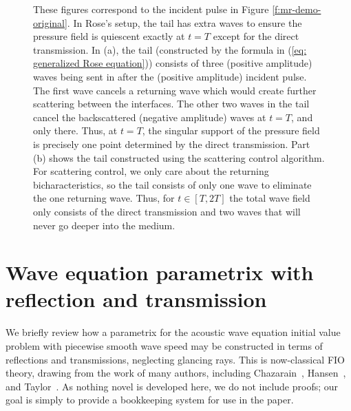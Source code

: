 \documentclass[10pt]{article}
\theoremstyle{plain}
\theoremstyle{definition}
\theoremstyle{remark}
\numberwithin{theorem}{section}
\numberwithin{example}{section}
\numberwithin{equation}{section}
\numberwithin{figure}{section}
\begin{document}
\begin{figure}
\label{f: 1d comparisons}
\centering
\caption{
 These figures correspond to the incident pulse in Figure \ref{f:mr-demo-original}. In Rose's setup, the tail has extra waves to ensure the pressure field is quiescent exactly at $t=T$ except for the direct transmission.
In (a), the tail (constructed by the formula in (\ref{eq: generalized Rose equation})) consists of three (positive amplitude) waves being sent in after the (positive amplitude) incident pulse. The first wave cancels a returning wave which would create further scattering between the interfaces. The other two waves in the tail cancel the backscattered (negative amplitude) waves at $t=T$, and only there. Thus, at $t=T$, the singular support of the pressure field is precisely one point determined by the direct transmission. Part (b) shows the tail constructed using the scattering control algorithm. For scattering control, we only care about the returning bicharacteristics, so the tail consists of only one wave to eliminate the one returning wave. Thus, for $t\in [T,2T]$ the total wave field only consists of the direct transmission and two waves that will never go deeper into the medium.}
\label{f:rose-and-sc}
\end{figure}








\appendix


\section{Wave equation parametrix with reflection and transmission}		\label{s:parametrix-construction}

We briefly review how a parametrix for the acoustic wave equation initial value problem with piecewise smooth wave speed may be constructed in terms of reflections and transmissions, neglecting glancing rays. This is now-classical FIO theory, drawing from the work of many authors, including Chazarain~\cite{Chazarain}, Hansen~\cite{Hansen}, and Taylor~\cite{Taylor75}. As nothing novel is developed here, we do not include proofs; our goal is simply to provide a bookkeeping system for use in the paper.
\end{document}
